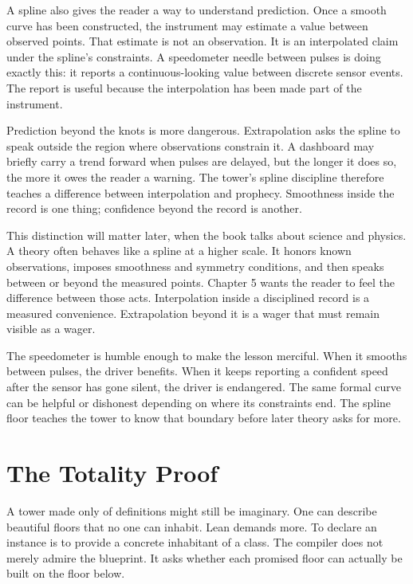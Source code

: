 A spline also gives the reader a way to understand prediction. Once a smooth
curve has been constructed, the instrument may estimate a value between
observed points. That estimate is not an observation. It is an interpolated
claim under the spline's constraints. A speedometer needle between pulses is
doing exactly this: it reports a continuous-looking value between discrete
sensor events. The report is useful because the interpolation has been made
part of the instrument.

Prediction beyond the knots is more dangerous. Extrapolation asks the spline
to speak outside the region where observations constrain it. A dashboard may
briefly carry a trend forward when pulses are delayed, but the longer it does
so, the more it owes the reader a warning. The tower's spline discipline
therefore teaches a difference between interpolation and prophecy. Smoothness
inside the record is one thing; confidence beyond the record is another.

This distinction will matter later, when the book talks about science and
physics. A theory often behaves like a spline at a higher scale. It honors
known observations, imposes smoothness and symmetry conditions, and then speaks
between or beyond the measured points. Chapter 5 wants the reader to feel the
difference between those acts. Interpolation inside a disciplined record is a
measured convenience. Extrapolation beyond it is a wager that must remain
visible as a wager.

The speedometer is humble enough to make the lesson merciful. When it smooths
between pulses, the driver benefits. When it keeps reporting a confident speed
after the sensor has gone silent, the driver is endangered. The same formal
curve can be helpful or dishonest depending on where its constraints end. The
spline floor teaches the tower to know that boundary before later theory asks
for more.

\section{The Totality Proof}
\label{se:totality-proof}

A tower made only of definitions might still be imaginary. One can describe
beautiful floors that no one can inhabit. Lean demands more. To declare an
instance is to provide a concrete inhabitant of a class. The compiler does not
merely admire the blueprint. It asks whether each promised floor can actually
be built on the floor below.

